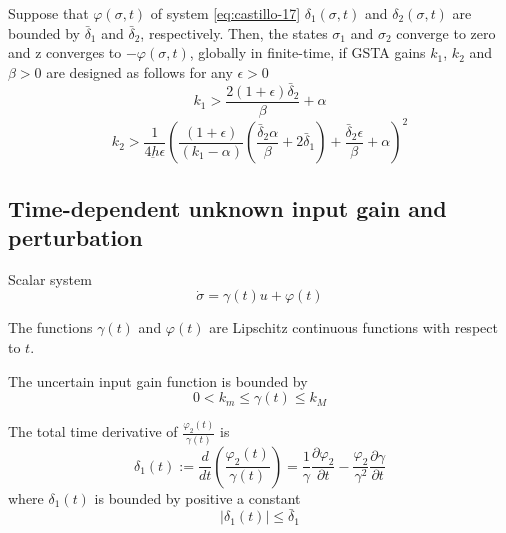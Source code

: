 \begin{corollary}
    Suppose that $\varphi(\sigma, t)$ of system \eqref{eq:castillo-17} $\delta_1(\sigma, t)$ and $\delta_2(\sigma, t)$ are bounded by $\bar{\delta}_1$ and $\bar{\delta}_2$, respectively. Then, the states $\sigma_1$ and $\sigma_2$ converge to zero and z converges to $-\varphi(\sigma, t)$, globally in finite-time, if GSTA gains $k_1$, $k_2$ and $\beta > 0$ are designed as follows for any $\epsilon > 0$
    \begin{equation}
        k_1 > \frac{2(1+\epsilon)\bar{\delta}_2}{\beta} + \alpha
    \end{equation}
    \begin{equation}
        k_2 > \frac{1}{4\underbar{h}\epsilon}
        \left(
        \frac{(1+\epsilon)}{(k_1 - \alpha)}
        \left(
            \frac{\bar{\delta}_2\alpha}{\beta} + 2\bar{\delta}_1
        \right)
        + \frac{\bar{\delta}_2\epsilon}{\beta} + \alpha
        \right)^2
    \end{equation}
\end{corollary}

\subsection{Time-dependent unknown input gain and perturbation}
Scalar system
\begin{equation}
    \dot{\sigma} = \gamma(t)u + \varphi(t)
    \label{eq:castillo-24}
\end{equation}
\begin{assumption}
    The functions $\gamma(t)$ and $\varphi(t)$ are Lipschitz continuous functions with respect to $t$.
\end{assumption}
\begin{assumption}
    The uncertain input gain function is bounded by
    \begin{equation}
        0 < k_m \leq \gamma(t) \leq k_M
        \label{eq:castillo-25}
    \end{equation}
\end{assumption}
\begin{assumption}
The total time derivative of $\frac{\varphi_2(t)}{\gamma(t)}$ is 
\begin{equation}
    \delta_1(t) := \frac{d}{dt}\left(\frac{\varphi_2(t)}{\gamma(t)}\right) = 
    \frac{1}{\gamma}\frac{\partial \varphi_2}{\partial t} - \frac{\varphi_2}{\gamma^2}\frac{\partial \gamma}{\partial t}
\end{equation}
where $\delta_1(t)$ is bounded by positive a constant
\begin{equation}
    |\delta_1(t)| \leq \bar{\delta}_1
\label{eq:castillo-27}
\end{equation}
\end{assumption}

